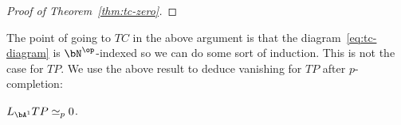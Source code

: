 \documentclass[a4paper,10pt]{amsart}
\begin{document}
\begin{proof}[Proof of Theorem~\ref{thm:tc-zero}]

%
%
%
%
% 
% 
%
\end{proof}
 
 
 
 
 The point of going to $TC$ in the above argument is that the diagram~\eqref{eq:tc-diagram} is $\bN^{\op}$-indexed so we can do some sort of induction. This is not the case for $TP$. We use the above result to deduce vanishing for $TP$ after $p$-completion:
 
 \begin{cor} \label{lem:tp-zero} $L_{\bA^1}TP \simeq_p 0$.
 \end{cor}
 
\end{document}
